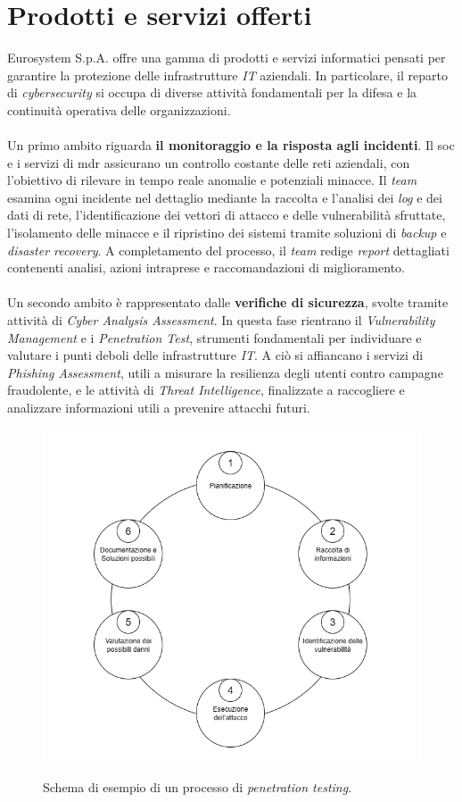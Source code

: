 \section{Prodotti e servizi offerti}  
Eurosystem S.p.A. offre una gamma di prodotti e servizi informatici pensati per garantire la protezione delle infrastrutture \textit{IT} aziendali. In particolare, il reparto di \textit{cybersecurity} si occupa di diverse attività fondamentali per la difesa e la continuità operativa delle organizzazioni.\\\\  
Un primo ambito riguarda \textbf{il monitoraggio e la risposta agli incidenti}. Il \gls{soc} e i servizi di \gls{mdr} assicurano un controllo costante delle reti aziendali, con l'obiettivo di rilevare in tempo reale anomalie e potenziali minacce. Il \textit{team} esamina ogni incidente nel dettaglio mediante la raccolta e l'analisi dei \textit{log} e dei dati di rete, l'identificazione dei vettori di attacco e delle vulnerabilità sfruttate, l'isolamento delle minacce e il ripristino dei sistemi tramite soluzioni di \textit{backup} e \textit{disaster recovery}. A completamento del processo, il \textit{team} redige \textit{report} dettagliati contenenti analisi, azioni intraprese e raccomandazioni di miglioramento.\\\\  
Un secondo ambito è rappresentato dalle \textbf{verifiche di sicurezza}, svolte tramite attività di \textit{Cyber Analysis Assessment}. In questa fase rientrano il \textit{Vulnerability Management} e i \textit{Penetration Test}, strumenti fondamentali per individuare e valutare i punti deboli delle infrastrutture \textit{IT}. A ciò si affiancano i servizi di \textit{Phishing Assessment}, utili a misurare la resilienza degli utenti contro campagne fraudolente, e le attività di \textit{Threat Intelligence}, finalizzate a raccogliere e analizzare informazioni utili a prevenire attacchi futuri.  
\begin{figure}[H]
    \centering
    \includegraphics[alt={Schema Penetration Test}, width=0.95\columnwidth]{img/Pen_test.png}
    \caption{Schema di esempio di un processo di \textit{penetration testing}.}
    \label{fig:pen_test}    
\end{figure}  
